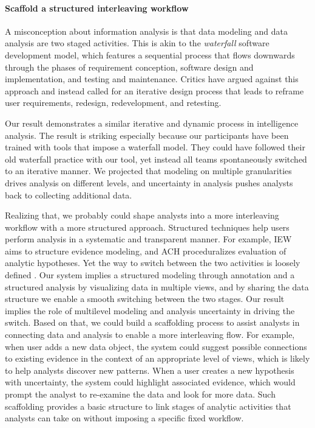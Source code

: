\paragraph{Scaffold a structured interleaving workflow}

A misconception about information analysis is that data modeling and
data analysis are two staged activities. This is akin to the \emph{waterfall}
software development model, which features a sequential process that
flows downwards through the phases of requirement conception, software
design and implementation, and testing and maintenance. Critics have
argued against this approach and instead called for an iterative design
process that leads to reframe user requirements,
redesign, redevelopment, and retesting.

Our result demonstrates a similar iterative and dynamic process in intelligence
analysis. The result is striking especially because our participants have been
trained with tools that impose a waterfall model. They could have followed their
old waterfall practice with our tool, yet instead all teams spontaneously
switched to an iterative manner. We projected that modeling on multiple granularities drives analysis on different levels, and uncertainty in analysis pushes analysts back to collecting additional data.

Realizing that, we probably could shape analysts into a more interleaving
workflow with a more structured approach. Structured techniques help users
perform analysis in a systematic and transparent manner. For example, IEW aims
to structure evidence modeling, and ACH proceduralizes evaluation of analytic
hypotheses. Yet the way to switch between the two activities is loosely defined
\cite{Kang2011}. Our system implies a structured modeling through annotation and
a structured analysis by visualizing data in multiple views, and by sharing the
data structure we enable a smooth switching between the two stages. Our result
implies the role of multilevel modeling and analysis uncertainty in driving the
switch. Based on that, we could build a scaffolding process to assist analysts
in connecting data and analysis to enable a more interleaving flow. For example,
when user adds a new data object, the system could suggest possible connections
to existing evidence in the context of an appropriate level of views, which is
likely to help analysts discover new patterns. When a user creates a new
hypothesis with uncertainty, the system could highlight associated evidence,
which would prompt the analyst to re-examine the data and look for more data.
Such scaffolding provides a basic structure to link stages of analytic
activities that analysts can take on without imposing a specific fixed workflow.

